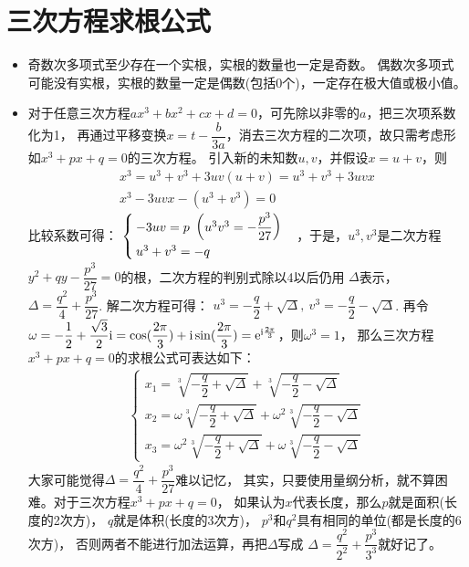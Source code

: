 \section{三次方程求根公式}
\begin{itemize}[leftmargin=\inteval{\myitemleftmargin}pt,itemsep=
   \inteval{\myitemitempsep}pt,topsep=\inteval{\myitemtopsep}pt]
\item 奇数次多项式至少存在一个实根，实根的数量也一定是奇数。
偶数次多项式可能没有实根，实根的数量一定是偶数(包括0个)，一定存在极大值或极小值。

\item 对于任意三次方程$ ax^3+bx^2+cx+d=0 $，可先除以非零的$ a $，把三次项系数化为1，
再通过平移变换$ x=t-\dfrac{b}{3a} $，消去三次方程的二次项，故只需考虑形如$ x^3+px+q=0 $的三次方程。
引入新的未知数$ u,v $，并假设$ x=u+v $，则
\begin{gather*}
    x^3=u^3+v^3+3uv(u+v)=u^3+v^3+3uvx  \\
     x^3-3uvx-(u^3+v^3)=0
\end{gather*}
比较系数可得：
$ \begin{cases}
-3uv = p \ \left(u^3v^3=-\dfrac{p^3}{27} \right) \\
u^3+v^3 = -q
\end{cases} \vspace{-4mm} $，于是，$ u^3,v^3 $是二次方程$ y^2+qy-\dfrac{p^3}{27}=0 $的根，二次方程的判别式除以4以后仍用
$ \Delta $表示，$ \Delta=\dfrac{q^2}{4}+\dfrac{p^3}{27} $. 解二次方程可得：
$ u^3=-\dfrac{q}{2} + \sqrt{\Delta},\ v^3=-\dfrac{q}{2} - \sqrt{\Delta}$.
再令$ \omega=-\dfrac{1}{2}+\dfrac{\sqrt{3}}{2}\mathrm{i} =
\cos(\dfrac{2\pi}{3})+\mathrm{i}\sin(\dfrac{2\pi}{3})=\mathrm{e}^{\mathrm{i}\frac{2\pi}{3}}$，则$ \omega^3=1 $， 那么三次方程$ x^3+px+q=0 $的求根公式可表达如下：
\begin{align*}
\begin{cases}
    x_1= \sqrt[3]{-\dfrac{q}{2} + \sqrt{\Delta}}+
    \sqrt[3]{-\dfrac{q}{2} - \sqrt{\Delta}} \\
    x_2= \omega\sqrt[3]{-\dfrac{q}{2} + \sqrt{\Delta}}+
    \omega^2\sqrt[3]{-\dfrac{q}{2} - \sqrt{\Delta}} \\
    x_3= \omega^2\sqrt[3]{-\dfrac{q}{2} + \sqrt{\Delta}}+
    \omega\sqrt[3]{-\dfrac{q}{2} - \sqrt{\Delta}} 
\end{cases} 
\end{align*}
大家可能觉得$ \Delta=\dfrac{q^2}{4}+\dfrac{p^3}{27} $难以记忆，
其实，只要使用量纲分析，就不算困难。对于三次方程$ x^3+px+q=0 $，
如果认为$ x $代表长度，那么$ p $就是面积(长度的2次方)，
$ q $就是体积(长度的3次方)，
$ p^3 $和$ q^2 $具有相同的单位(都是长度的6次方)，
否则两者不能进行加法运算，再把$ \Delta $写成
$ \Delta=\dfrac{q^2}{2^2}+\dfrac{p^3}{3^3} $就好记了。


\end{itemize}
